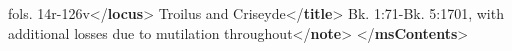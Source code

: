 \begin{shaded}
\hspace*{1em}fols. 14r-126v{</\textbf{locus}>}\mbox{}\newline 
\hspace*{1em}Troilus and Criseyde{</\textbf{title}>}\mbox{}\newline 
\hspace*{1em}Bk. 1:71-Bk. 5:1701, with additional losses due to mutilation\mbox{}\newline 
\hspace*{1em}\hspace*{1em}\hspace*{1em}\hspace*{1em} throughout{</\textbf{note}>}\mbox{}\newline 
{}\mbox{}\newline 
{</\textbf{msContents}>}\end{shaded}\egroup\par \par
